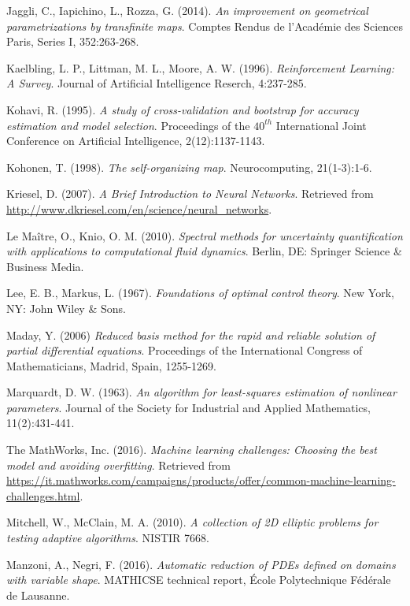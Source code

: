 \documentclass[12pt, a4paper, twoside, openright, notitlepage]{report}
\numberwithin{equation}{chapter}
\theoremstyle{theorem}
\theoremstyle{definition}
\theoremstyle{remark}
\theoremstyle{proposition}
\numberwithin{figure}{chapter}
\begin{document}
\begin{thebibliography}{50}
		Jaggli, C., Iapichino, L., Rozza, G. (2014). \emph{An improvement on geometrical parametrizations by transfinite maps}. Comptes Rendus de l'Acad\'emie des Sciences Paris, Series I, 352:263-268. 
				
		Kaelbling, L. P., Littman, M. L., Moore, A. W. (1996). \emph{Reinforcement Learning: A Survey}. Journal of Artificial Intelligence Reserch, 4:237-285.
		
		Kohavi, R. (1995). \emph{A study of cross-validation and bootstrap for accuracy estimation and model selection}. Proceedings of the $40^{th}$ International Joint Conference on Artificial Intelligence, 2(12):1137-1143.
		
		Kohonen, T. (1998). \emph{The self-organizing map}. Neurocomputing, 21(1-3):1-6.
		
		Kriesel, D. (2007). \emph{A Brief Introduction to Neural Networks}. Retrieved from \url{http://www.dkriesel.com/en/science/neural_networks}.
		
		Le Ma\^{i}tre, O., Knio, O. M. (2010). \emph{Spectral methods for uncertainty quantification with applications to computational fluid dynamics}. Berlin, DE: Springer Science \& Business Media.
		
		Lee, E. B., Markus, L. (1967). \emph{Foundations of optimal control theory}. New York, NY: John Wiley \& Sons.
		
		Maday, Y. (2006) \emph{Reduced basis method for the rapid and reliable solution of partial differential equations}. Proceedings of the International Congress of Mathematicians, Madrid, Spain, 1255-1269.
		
		Marquardt, D. W. (1963). \emph{An algorithm for least-squares estimation of nonlinear parameters}. Journal of the Society for Industrial and Applied Mathematics, 11(2):431-441.
		
		The MathWorks, Inc. (2016). \emph{Machine learning challenges: Choosing the best model and avoiding overfitting}. Retrieved from \url{https://it.mathworks.com/campaigns/products/offer/common-machine-learning-challenges.html}.
		
		Mitchell, W., McClain, M. A. (2010). \emph{A collection of 2D elliptic problems for testing adaptive algorithms}. NISTIR 7668.
		
		Manzoni, A., Negri, F. (2016). \emph{Automatic reduction of PDEs defined on domains with variable shape}. MATHICSE technical report, \'Ecole Polytechnique F\'ed\'erale de Lausanne.
		

\end{thebibliography}
\end{document}
